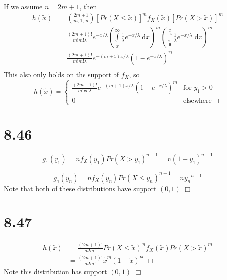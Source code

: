 \documentclass{article}
\begin{document}
If we assume $n = 2m + 1$, then
\begin{equation*}
\begin{split}
  h(\tilde{x}) &= \binom{2m+1}{m,1,m}\left[Pr(X \leq \tilde{x})\right]^{m} f_X(\tilde{x}) \left[Pr(X > \tilde{x})\right]^{m}\\
  &= \frac{(2m+1)!}{m!m!\lambda} e^{-\tilde{x}/\lambda} \left(\int\limits_{\tilde{x}}^\infty \frac{1}{\lambda}e^{-x/\lambda} \;\mathrm{d}x \right)^{m} \left(\int\limits_0^{\tilde{x}} \frac{1}{\lambda}e^{-x/\lambda} \;\mathrm{d}x \right)^{m}\\
  &= \frac{(2m+1)!}{m!m!\lambda} e^{-(m+1)\tilde{x}/\lambda} \left(1 - e^{-\tilde{x}/\lambda} \right)^m\\
\end{split}
\end{equation*}
This also only holds on the support of $f_X$, so
\begin{equation*}
h(\tilde{x}) =
\begin{cases}
  \frac{(2m+1)!}{m!m!\lambda} e^{-(m+1)\tilde{x}/\lambda} \left(1 - e^{-\tilde{x}/\lambda} \right)^m & \text{for } y_1 > 0\\
  0 & \text{elsewhere} \;\Box
\end{cases}
\end{equation*}

\section*{8.46}
\begin{equation*}
  g_1(y_1) = nf_X(y_1) Pr(X > y_1)^{n-1} = n(1-y_1)^{n-1}
\end{equation*}

\begin{equation*}
  g_n(y_n) = nf_X(y_n) Pr(X \leq y_n)^{n-1} = n{y_n}^{n-1}
\end{equation*}
Note that both of these distributions have support $(0,1)$ $\Box$

\section*{8.47}
\begin{equation*}
\begin{split}
  h(\tilde{x}) &= \frac{(2m+1)!}{m!m!} Pr(X \leq \tilde{x})^m f_X(\tilde{x}) Pr(X > \tilde{x})^m\\
  &= \frac{(2m+1)!}{m!m!} \tilde{x}^m (1-\tilde{x})^m \; \Box
\end{split}
\end{equation*}
Note this distribution has support $(0,1)$ $\Box$
\end{document}
